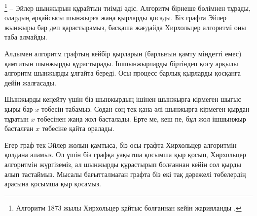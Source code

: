 
\footnote{Алгоритм 1873 жылы Хирхольцер қайтыс болғаннан кейін жарияланды \cite{hie73}.} -- Эйлер шынжырын құрайтын тиімді әдіс.
Алгоритм бірнеше бөлімнен тұрады, олардың әрқайсысы
шынжырға жаңа қырларды қосады.
Біз графта Эйлер жынжыры бар деп қарастырамыз,
басқаша жағдайда Хирхольцер алгоритмі оны таба алмайды.

Алдымен алгоритм графтың кейбір қырларын (барлығын қамту 
міндетті емес) қамтитын шынжырды құрастырады.
Ішшынжырларды біртіндеп қосу арқылы алгоритм шынжырды ұлғайта береді.
Осы процесс барлық қырларды қосқанға дейін жалғасады. 

Шынжырды кеңейту үшін біз шынжырдың ішінен шынжырға кірмеген шығыс қыры бар $x$ төбесін табамыз. Содан соң тек қана әлі шынжырға кірмеген қырдан тұратын $x$ төбесінен жаңа жол басталады. Ерте ме, кеш пе, бұл жол ішшынжыр басталған $x$ төбесіне қайта оралады.     


Егер граф тек Эйлер жолын қамтыса, біз осы
графта Хирхольцер алгоритмін қолдана аламыз.
Ол үшін біз графқа уақытша қосымша қыр қосып, 
Хирхольцер алгоритмін жүргіземіз, ал шынжырды құрастырып
болғаннан кейін сол қырды алып тастаймыз.
Мысалы бағытталмаған графта біз екі тақ дәрежелі
төбелердің арасына қосымша қыр қосамыз.

